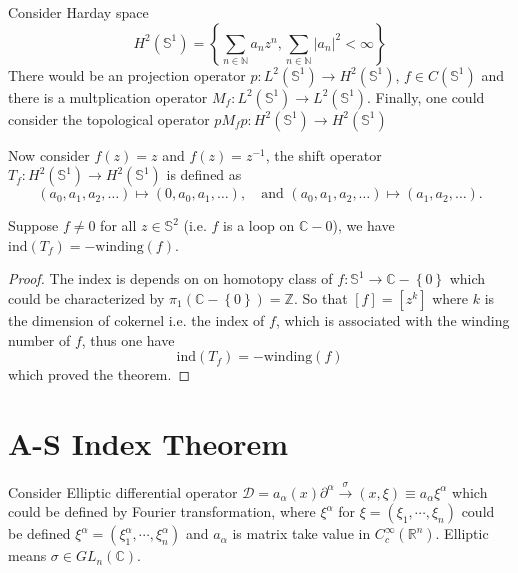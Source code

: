 \documentclass[10pt]{article}
\begin{document}
\begin{example}
  Consider Harday space
  \begin{equation*}
    H^{2}(\mathbb{S}^{1}) = \left\{ \sum_{n \in \mathbb{N}} a_{n} z^{n}, \sum_{n \in \mathbb{N}} \left| a_n \right|^{2} < \infty \right\}
  \end{equation*}
  There would be an projection operator $ p : L^{2}(\mathbb{S}^{1}) \rightarrow H^{2}(\mathbb{S}^{1})$, $ f \in C(\mathbb{S}^{1})$ and there is a multplication operator $ M_{f} : L^{2}(\mathbb{S}^{1}) \rightarrow L^{2}(\mathbb{S}^{1})$.
  Finally, one could consider the topological operator $ p M_{f} p : H^{2}(\mathbb{S}^{1}) \rightarrow H^{2}(\mathbb{S}^{1})$

  Now consider $ f(z) = z$ and $ f(z) = z^{-1}$, the shift operator $ T_{f} : H^{2}(\mathbb{S}^{1}) \rightarrow H^{2}(\mathbb{S}^{1})$ is defined as
  \begin{equation*}
    (a_0, a_1, a_2, \ldots) \mapsto (0, a_0, a_1, \ldots), \quad \text{and } (a_0, a_1, a_2, \ldots) \mapsto (a_1, a_2, \ldots).
  \end{equation*}
  \begin{theorem}
    Suppose $ f \neq 0$ for all $ z \in \mathbb{S}^{2}$ (i.e. $ f$ is a loop on $ \mathbb{C}- {0}$), we have $ \mathrm{ind}(T_{f}) = - \mathrm{winding}(f)$.
  \end{theorem}
  \begin{proof}
    The index is depends on on homotopy class of $ f: \mathbb{S}^{1} \rightarrow \mathbb{C}-\left\{ 0 \right\}$ which could be characterized by $ \pi_1(\mathbb{C}-\left\{ 0 \right\}) = \mathbb{Z}$. So that $[f] = [z^{k}]$ where $ k$ is the dimension of cokernel i.e. the index of $ f$, which is associated with the winding number of $ f$, thus one have
    \begin{equation*}
      \mathrm{ind}(T_{f}) = - \mathrm{winding}(f)
    \end{equation*}
    which proved the theorem.
  \end{proof}
\end{example}

\section{A-S Index Theorem}

Consider Elliptic differential operator $ \mathcal{D} = a_{\alpha}(x) \partial^{\alpha} \xrightarrow \sigma(x, \xi) \equiv a_{\alpha} \xi^{\alpha}$ which could be defined by Fourier transformation,
where $ \xi^{\alpha}$ for $ \xi = (\xi_{1},\cdots ,\xi_{n})$ could be defined  $ \xi^{\alpha} = (\xi_{1}^{\alpha}, \cdots ,\xi_{n}^{\alpha})$ and $ a_{\alpha}$ is matrix take value in $ C^{\infty }_{c}(\mathbb{R}^{n})$.
Elliptic means $ \sigma \in GL_{n}(\mathbb{C})$.
\end{document}
